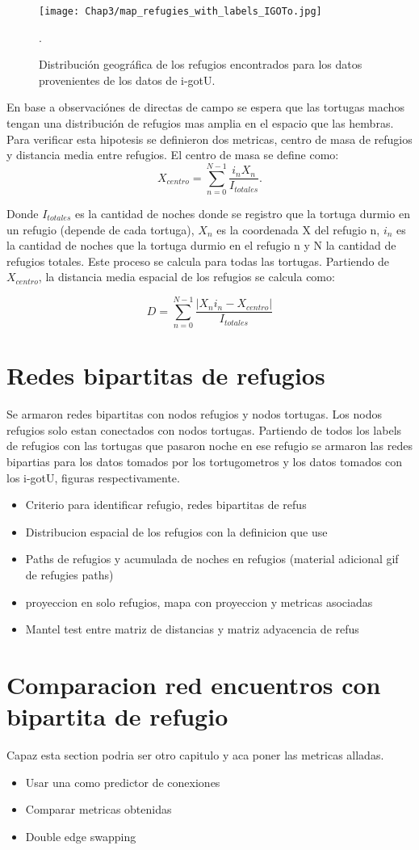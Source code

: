\begin{figure}[h]
    \begin{center}
        \texttt{[image: Chap3/map\_refugies\_with\_labels\_IGOTo.jpg]}
        \caption{Distribución geográfica de los refugios encontrados para los datos provenientes de los datos de i-gotU.} 
        \label{fig:refus_igotu_labels}.
        
        \end{center}
\end{figure} 

En base a observaciónes de directas de campo \cite{Erika} se espera que las tortugas machos tengan una distribución de refugios mas amplia en el espacio que las hembras.  Para verificar esta hipotesis se definieron dos metricas, centro de masa de refugios y distancia media entre refugios. El centro de masa se define como:
    $$X_{centro}= \sum^{N -1}_{n=0} \frac{i_{n} X_n}{I_{totales}}.$$

Donde $I_{totales}$ es la cantidad de noches donde se registro que la tortuga durmio en un refugio (depende de cada tortuga), $X_n$ es la coordenada X del refugio n, $i_{n}$ es la cantidad de noches que la tortuga durmio en el refugio n y N la cantidad de refugios totales.  Este proceso se calcula para todas las tortugas. 
Partiendo de $X_{centro}$, la distancia media  espacial de los refugios se calcula como:

$$D = \sum^{N -1}_{n=0} \frac{|X_n i_n - X_{centro}|}{I_{totales}}$$
\section{Redes bipartitas de refugios}
Se armaron redes bipartitas con nodos refugios y nodos tortugas. Los nodos refugios solo estan conectados con nodos tortugas.  Partiendo de todos los labels de refugios con las tortugas que pasaron noche en ese refugio se armaron las redes bipartias para los datos tomados por los tortugometros y los datos tomados con los i-gotU, figuras respectivamente.%

\begin{itemize}
    \item Criterio para identificar refugio, redes bipartitas de refus
    \item Distribucion espacial de los refugios con la definicion que use
    \item Paths de refugios y acumulada de noches en refugios (material adicional gif de refugies paths)
    \item proyeccion en solo refugios, mapa con proyeccion y metricas asociadas 
    \item Mantel test entre matriz de distancias y matriz adyacencia de refus 
\end{itemize}
\section{Comparacion red encuentros con bipartita de refugio}
Capaz esta section podria ser otro capitulo y aca poner las metricas alladas.
\begin{itemize}
    \item Usar una como predictor de conexiones 
    \item Comparar metricas obtenidas 
    \item Double edge swapping 
\end{itemize}